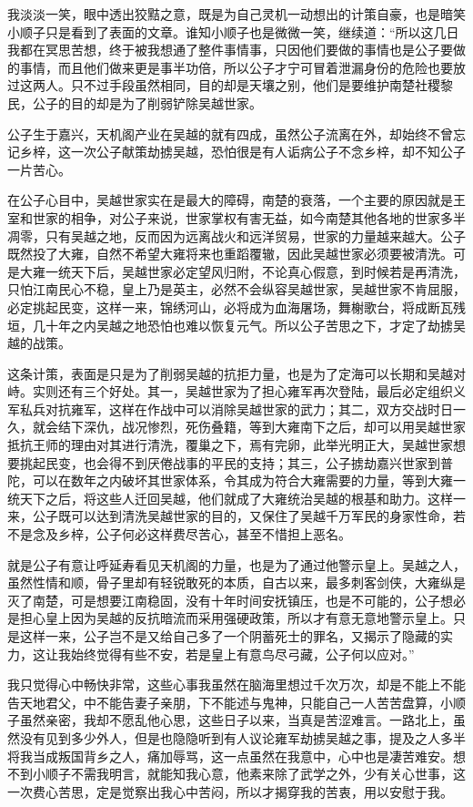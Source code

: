 我淡淡一笑，眼中透出狡黠之意，既是为自己灵机一动想出的计策自豪，也是暗笑小顺子只是看到了表面的文章。谁知小顺子也是微微一笑，继续道：“所以这几日我都在冥思苦想，终于被我想通了整件事情事，只因他们要做的事情也是公子要做的事情，而且他们做来更是事半功倍，所以公子才宁可冒着泄漏身份的危险也要放过这两人。只不过手段虽然相同，目的却是天壤之别，他们是要维护南楚社稷黎民，公子的目的却是为了削弱铲除吴越世家。

公子生于嘉兴，天机阁产业在吴越的就有四成，虽然公子流离在外，却始终不曾忘记乡梓，这一次公子献策劫掳吴越，恐怕很是有人诟病公子不念乡梓，却不知公子一片苦心。

在公子心目中，吴越世家实在是最大的障碍，南楚的衰落，一个主要的原因就是王室和世家的相争，对公子来说，世家掌权有害无益，如今南楚其他各地的世家多半凋零，只有吴越之地，反而因为远离战火和远洋贸易，世家的力量越来越大。公子既然投了大雍，自然不希望大雍将来也重蹈覆辙，因此吴越世家必须要被清洗。可是大雍一统天下后，吴越世家必定望风归附，不论真心假意，到时候若是再清洗，只怕江南民心不稳，皇上乃是英主，必然不会纵容吴越世家，吴越世家不肯屈服，必定挑起民变，这样一来，锦绣河山，必将成为血海屠场，舞榭歌台，将成断瓦残垣，几十年之内吴越之地恐怕也难以恢复元气。所以公子苦思之下，才定了劫掳吴越的战策。

这条计策，表面是只是为了削弱吴越的抗拒力量，也是为了定海可以长期和吴越对峙。实则还有三个好处。其一，吴越世家为了担心雍军再次登陆，最后必定组织义军私兵对抗雍军，这样在作战中可以消除吴越世家的武力；其二，双方交战时日一久，就会结下深仇，战况惨烈，死伤叠籍，等到大雍南下之后，却可以用吴越世家抵抗王师的理由对其进行清洗，覆巢之下，焉有完卵，此举光明正大，吴越世家想要挑起民变，也会得不到厌倦战事的平民的支持；其三，公子掳劫嘉兴世家到普陀，可以在数年之内破坏其世家体系，令其成为符合大雍需要的力量，等到大雍一统天下之后，将这些人迁回吴越，他们就成了大雍统治吴越的根基和助力。这样一来，公子既可以达到清洗吴越世家的目的，又保住了吴越千万军民的身家性命，若不是念及乡梓，公子何必这样费尽苦心，甚至不惜担上恶名。

就是公子有意让呼延寿看见天机阁的力量，也是为了通过他警示皇上。吴越之人，虽然性情和顺，骨子里却有轻锐敢死的本质，自古以来，最多刺客剑侠，大雍纵是灭了南楚，可是想要江南稳固，没有十年时间安抚镇压，也是不可能的，公子想必是担心皇上因为吴越的反抗暗流而采用强硬政策，所以才有意无意地警示皇上。只是这样一来，公子岂不是又给自己多了一个阴蓄死士的罪名，又揭示了隐藏的实力，这让我始终觉得有些不安，若是皇上有意鸟尽弓藏，公子何以应对。”

我只觉得心中畅快非常，这些心事我虽然在脑海里想过千次万次，却是不能上不能告天地君父，中不能告妻子亲朋，下不能述与鬼神，只能自己一人苦苦盘算，小顺子虽然亲密，我却不愿乱他心思，这些日子以来，当真是苦涩难言。一路北上，虽然没有见到多少外人，但是也隐隐听到有人议论雍军劫掳吴越之事，提及之人多半将我当成叛国背乡之人，痛加辱骂，这一点虽然在我意中，心中也是凄苦难安。想不到小顺子不需我明言，就能知我心意，他素来除了武学之外，少有关心世事，这一次费心苦思，定是觉察出我心中苦闷，所以才揭穿我的苦衷，用以安慰于我。


